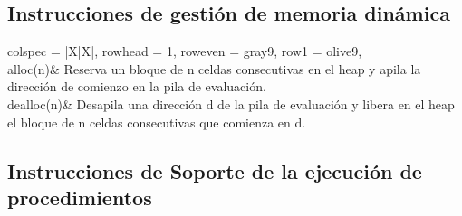\subsection{Instrucciones de gestión de memoria dinámica}

\begin{longtblr}[
    caption = {Instrucciones de gestión de memoria dinámica}
]{
    colspec = {|X|X|},
    rowhead = 1,
    row{even} = {gray9},
    row{1} = {olive9},
}
    \hline
    \textbf{} \\ \hline
     alloc(n)& Reserva un bloque de n celdas consecutivas en el heap y
apila la dirección de comienzo en la pila de evaluación.  \\ \hline
     dealloc(n)& Desapila una dirección d de la pila de evaluación y libera en
el heap el bloque de n celdas consecutivas que comienza en
d.  \\ \hline
 
\end{longtblr}
    
\subsection{Instrucciones de Soporte de la ejecución de procedimientos}

